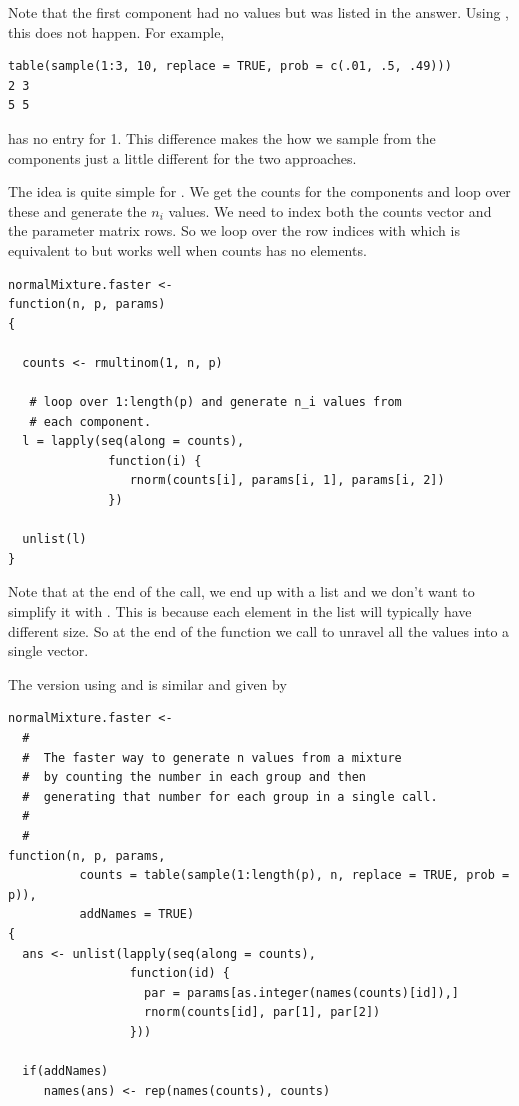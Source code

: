 \documentclass{article}
\begin{document}
\begin{description}
Note that the first component had no values but was listed
in the answer.
Using , this does not happen.
For example, 
\begin{verbatim}
table(sample(1:3, 10, replace = TRUE, prob = c(.01, .5, .49)))
2 3 
5 5 
\end{verbatim}
has no entry for 1.
This difference makes the how we sample from the components
just a little different for the two approaches.

The idea is quite simple for .
We get the counts for the components and loop
over these and generate the $n_i$ values.
We need to index both the counts vector and 
the parameter matrix rows.
So we loop over the row indices
with 
which is equivalent to 
but works well when counts has no elements.
\begin{verbatim}
normalMixture.faster <-
function(n, p, params)
{

  counts <- rmultinom(1, n, p)

   # loop over 1:length(p) and generate n_i values from 
   # each component.
  l = lapply(seq(along = counts),
              function(i) {
                 rnorm(counts[i], params[i, 1], params[i, 2])
              }) 

  unlist(l)
}
\end{verbatim}
Note that at the end of the  call, we end up with a
list and we don't want to simplify it with . This is
because each element in the list will typically have different size.
So at the end of the function we call  to unravel
all the values into a single vector.

The version using  and 
is similar and given by
\begin{verbatim}
normalMixture.faster <-
  #
  #  The faster way to generate n values from a mixture
  #  by counting the number in each group and then 
  #  generating that number for each group in a single call.
  #
  #
function(n, p, params, 
          counts = table(sample(1:length(p), n, replace = TRUE, prob = p)),
          addNames = TRUE)
{
  ans <- unlist(lapply(seq(along = counts),
                 function(id) {
                   par = params[as.integer(names(counts)[id]),]
                   rnorm(counts[id], par[1], par[2])
                 }))

  if(addNames)
     names(ans) <- rep(names(counts), counts)


\end{verbatim}
\end{description}
\end{document}
